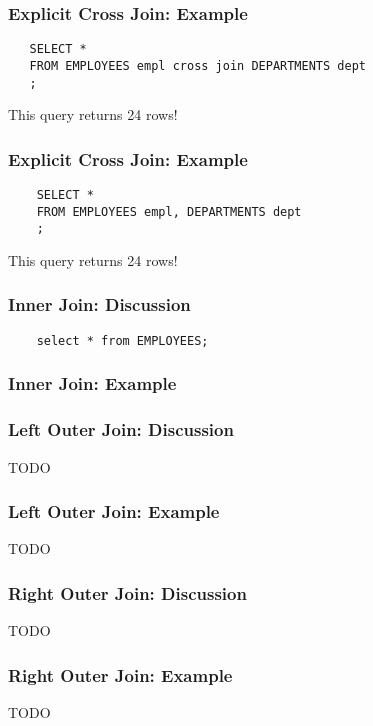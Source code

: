 \documentclass{beamer}
\begin{document}
\begin{frame}[containsverbatim]
  \frametitle{Explicit Cross Join: Example}
  \begin{lstlisting}
   SELECT *
   FROM EMPLOYEES empl cross join DEPARTMENTS dept
   ; 
  \end{lstlisting}
  
  \pause
  \bigskip
  This query returns 24 rows!
  
\end{frame}

\begin{frame}[containsverbatim]
  \frametitle{Explicit Cross Join: Example}
  \begin{lstlisting}
    SELECT *
    FROM EMPLOYEES empl, DEPARTMENTS dept
    ;

  \end{lstlisting}
  
  \pause
  \bigskip
  This query returns 24 rows!
  
\end{frame}



\begin{frame}[containsverbatim]
  \frametitle{Inner Join: Discussion}
  \begin{lstlisting} 
    select * from EMPLOYEES;
  \end{lstlisting}
\end{frame}

\begin{frame}
  \frametitle{Inner Join: Example}
  
\end{frame}

\begin{frame}
  \frametitle{Left Outer Join: Discussion}
  TODO
\end{frame}

\begin{frame}
  \frametitle{Left Outer Join: Example}
  TODO
\end{frame}

\begin{frame}
  \frametitle{Right Outer Join: Discussion}
  TODO
\end{frame}

\begin{frame}
  \frametitle{Right Outer Join: Example}
  TODO
\end{frame}
\end{document}
